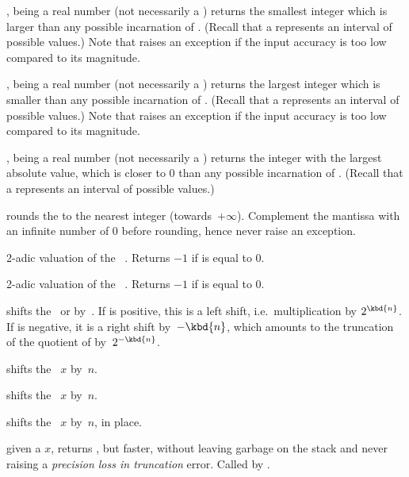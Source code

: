 ,  being a real number (not necessarily a
) returns the smallest integer which is larger than any possible
incarnation of . (Recall that a  represents an interval of
possible values.) Note that  raises an exception if the input
accuracy is too low compared to its magnitude.

,  being a real number (not necessarily a
) returns the largest integer which is smaller than any possible
incarnation of . (Recall that a  represents an interval of
possible values.) Note that  raises an exception if the input
accuracy is too low compared to its magnitude.

,  being a real number (not necessarily a
) returns the integer with the largest absolute value, which is closer
to $0$ than any possible incarnation of . (Recall that a 
represents an interval of possible values.)

 rounds the   to the nearest
integer (towards~$+\infty$). Complement the mantissa with an infinite number
of $0$ before rounding, hence never raise an exception.


 2-adic valuation of the ~. Returns
$-1$ if  is equal to 0.

 2-adic valuation of the ~. Returns $-1$
if  is equal to 0.

 shifts the~ or
  by~. If  is positive, this is a left shift,
i.e.~multiplication by $2^{\kbd{n}}$. If  is negative, it is a right
shift by~$-\kbd{n}$, which amounts to the truncation of the quotient of 
by~$2^{-\kbd{n}}$.

 shifts the ~$x$ by~$n$.

 shifts the ~$x$ by~$n$.

 shifts the ~$x$ by~$n$,
in place.

 given a  $x$, returns
, but faster, without leaving garbage on the stack
and never raising a \emph{precision loss in truncation} error.
Called by .

